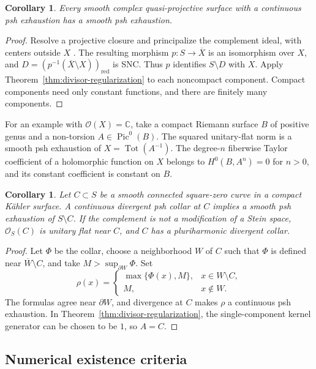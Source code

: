 \documentclass[11pt]{amsart}
\newtheorem{corollary}[theorem]{Corollary}
\theoremstyle{definition}
\theoremstyle{remark}
\numberwithin{equation}{section}
\newcommand{\C}{\mathbb C}
\newcommand{\OO}{\mathcal O}
\newcommand{\Tot}{\operatorname{Tot}}
\begin{document}
\begin{corollary}\label{cor:quasiprojective-regularization}
Every smooth complex quasi-projective surface with a continuous
psh exhaustion has a smooth psh exhaustion.
\end{corollary}
\begin{proof}
Resolve a projective closure and principalize the complement ideal,
with centers outside $X$ \cite[Theorems~1.0.1--1.0.2]{Wlodarczyk05}.
The resulting morphism $p:S\to\overline X$ is an isomorphism over
$X$, and $D=(p^{-1}(\overline X\setminus X))_{\mathrm{red}}$ is SNC.
Thus $p$ identifies $S\setminus D$ with $X$. Apply
Theorem~\ref{thm:divisor-regularization} to each noncompact component.
Compact components need only constant functions, and there are
finitely many components.
\end{proof}

For an example with $\OO(X)=\C$, take a compact Riemann surface
$B$ of positive genus and a non-torsion $A\in\operatorname{Pic}^0(B)$.
The squared unitary-flat norm is a smooth psh exhaustion of
$X=\Tot(A^{-1})$. The degree-$n$ fiberwise Taylor coefficient of a
holomorphic function on $X$ belongs to $H^0(B,A^n)=0$ for $n>0$,
and its constant coefficient is constant on $B$.

\begin{corollary}\label{cor:square-zero-continuous-collar}
Let $C\subset S$ be a smooth connected square-zero curve in a compact
K\"ahler surface. A continuous divergent psh collar at $C$ implies
a smooth psh exhaustion of $S\setminus C$. If the complement is not
a modification of a Stein space, $\OO_S(C)$ is unitary flat near $C$,
and $C$ has a pluriharmonic divergent collar.
\end{corollary}
\begin{proof}
Let $\Phi$ be the collar, choose a neighborhood $W$ of $C$ such that
$\Phi$ is defined near $\overline W\setminus C$,
and take $M>\sup_{\partial W}\Phi$. Set
\[
 \rho(x)=
 \begin{cases}\max\{\Phi(x),M\},&x\in W\setminus C,\\
 M,&x\notin W.
 \end{cases}
\]
The formulas agree near $\partial W$, and divergence at $C$ makes
$\rho$ a continuous psh exhaustion. In
Theorem~\ref{thm:divisor-regularization}, the single-component kernel
generator can be chosen to be $1$, so $A=C$.
\end{proof}

\subsection{Numerical existence criteria}\label{sec:surface-nonprojective}
\end{document}
